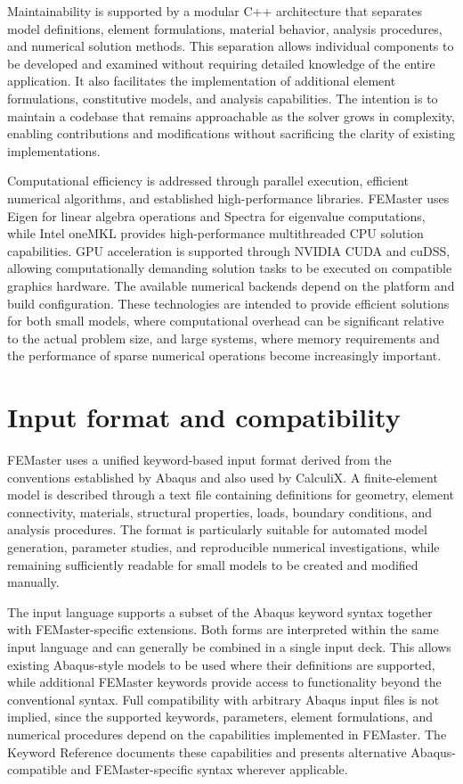 Maintainability is supported by a modular C++ architecture that separates model definitions, element formulations, material behavior, analysis procedures, and numerical solution methods. This separation allows individual components to be developed and examined without requiring detailed knowledge of the entire application. It also facilitates the implementation of additional element formulations, constitutive models, and analysis capabilities. The intention is to maintain a codebase that remains approachable as the solver grows in complexity, enabling contributions and modifications without sacrificing the clarity of existing implementations.

Computational efficiency is addressed through parallel execution, efficient numerical algorithms, and established high-performance libraries. FEMaster uses Eigen for linear algebra operations and Spectra for eigenvalue computations, while Intel oneMKL provides high-performance multithreaded CPU solution capabilities. GPU acceleration is supported through NVIDIA CUDA and cuDSS, allowing computationally demanding solution tasks to be executed on compatible graphics hardware. The available numerical backends depend on the platform and build configuration. These technologies are intended to provide efficient solutions for both small models, where computational overhead can be significant relative to the actual problem size, and large systems, where memory requirements and the performance of sparse numerical operations become increasingly important.


\section{Input format and compatibility}
\label{sec:input-compatibility}

FEMaster uses a unified keyword-based input format derived from the conventions established by Abaqus and also used by CalculiX. A finite-element model is described through a text file containing definitions for geometry, element connectivity, materials, structural properties, loads, boundary conditions, and analysis procedures. The format is particularly suitable for automated model generation, parameter studies, and reproducible numerical investigations, while remaining sufficiently readable for small models to be created and modified manually.

The input language supports a subset of the Abaqus keyword syntax together with FEMaster-specific extensions. Both forms are interpreted within the same input language and can generally be combined in a single input deck. This allows existing Abaqus-style models to be used where their definitions are supported, while additional FEMaster keywords provide access to functionality beyond the conventional syntax. Full compatibility with arbitrary Abaqus input files is not implied, since the supported keywords, parameters, element formulations, and numerical procedures depend on the capabilities implemented in FEMaster. The Keyword Reference documents these capabilities and presents alternative Abaqus-compatible and FEMaster-specific syntax wherever applicable.

